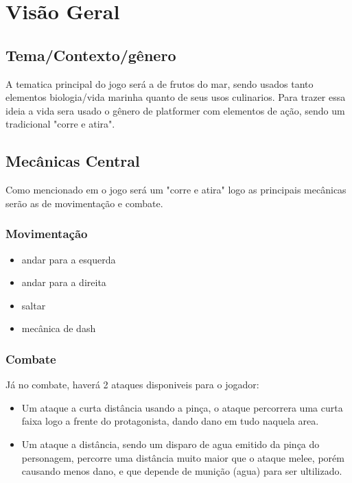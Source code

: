 
\section{Visão Geral}%
    \subsection{Tema/Contexto/gênero}%
    \label{sec:contexto}
    A tematica principal do jogo será a de frutos do mar, sendo usados tanto elementos biologia/vida marinha quanto de seus usos culinarios.
    Para trazer essa ideia a vida sera usado o gênero de platformer com elementos de ação, sendo um tradicional "corre e atira".\\

    \subsection{Mecânicas Central}%
    \label{sec:mecanica}
    Como mencionado em  o jogo será um "corre e atira" logo as principais mecânicas serão as de movimentação e combate.\\

        \subsubsection{Movimentação}\label{sec:mecanica:movimentação}

        \begin{itemize}
        \item andar para a esquerda
        \item andar para a direita
        \item saltar
        \item mecânica de dash
        \end{itemize}

        \subsubsection{Combate}\label{sec:mecanica:combate}
        Já no combate, haverá 2 ataques disponiveis para o jogador:

        \begin{itemize}
          \item Um ataque a curta distância usando a pinça, o ataque percorrera uma curta faixa logo a frente do protagonista, dando dano em tudo naquela area.
          \item Um ataque a distância, sendo um disparo de agua emitido da pinça do personagem, percorre uma distância muito maior que o ataque melee, porém causando menos dano, e que depende de munição (agua) para ser ultilizado.
        \end{itemize}

